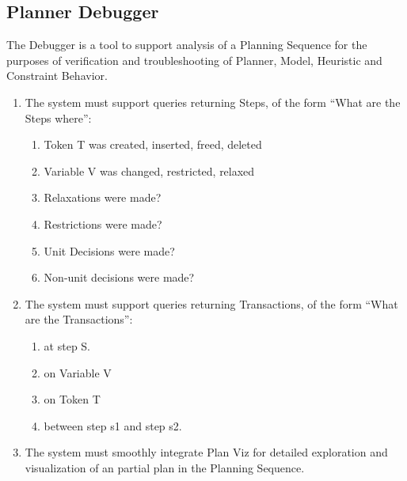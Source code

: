 \documentclass[twoside, 11pt]{article}
\begin{document}
\subsection{Planner Debugger}
The Debugger is a tool to support analysis of a Planning Sequence for the purposes of verification and troubleshooting of Planner, Model, Heuristic and Constraint Behavior.
\begin{enumerate}
\item The system must support queries returning Steps, of the form ``What are the Steps where'':
\begin{enumerate}
\item Token T was created, inserted, freed, deleted
\item Variable V was changed, restricted, relaxed
\item Relaxations were made?
\item Restrictions were made?
\item Unit Decisions were made?
\item Non-unit decisions were made?
\end{enumerate}
\item The system must support queries returning Transactions, of the form ``What are the Transactions'':
\begin{enumerate}
\item at step S.
\item on Variable V
\item on Token T
\item between step s1 and step s2.
\end{enumerate}
\item The system must smoothly integrate Plan Viz for detailed exploration and visualization of an partial plan in the Planning Sequence.
\end{enumerate}
\end{document}
